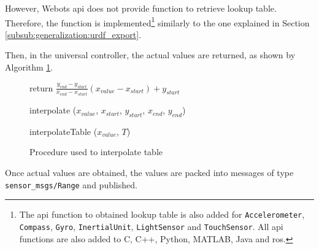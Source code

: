 However, Webots \ac{api} does not provide function to retrieve lookup table.
Therefore, the function is implemented\footnote{The \ac{api} function to obtained lookup table is also added for \texttt{Accelerometer}, \texttt{Compass}, \texttt{Gyro}, \texttt{InertialUnit}, \texttt{LightSensor} and \texttt{TouchSensor}.
All \ac{api} functions are also added to C, C++, Python, MATLAB, Java and \ac{ros}.} similarly to the one explained in Section \ref{subsub:generalization:urdf_export}.

Then, in the universal controller, the actual values are returned, as shown by Algorithm \ref{fig:generalization:interopolation}.

\begin{figure}[H]
    \begin{minipage}{\linewidth}
    \begin{procedure}[H]
        return $ \frac{y_{end} - y_{start}}{x_{end} - x_{start}} (x_{value} - x_{start}) + y_{start}
 $ \;
        \caption{interpolate ($x_{value}$, $x_{start}$, $y_{start}$, $x_{end}$, $y_{end}$)}
    \end{procedure}
    \end{minipage}
    \begin{minipage}{\linewidth}
    \begin{procedure}[H]


        \caption{interpolateTable ($x_{value}$, $T$)}
    \end{procedure}
    \end{minipage}
\caption{Procedure used to interpolate table}
\label{fig:generalization:interopolation}
\end{figure}

Once actual values are obtained, the values are packed into messages of type \texttt{sensor\_msgs/Range} and published.

